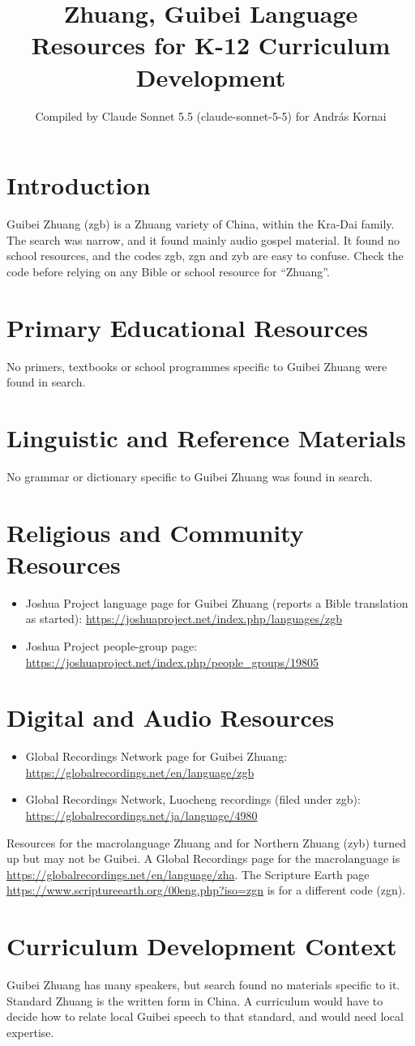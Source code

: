 \documentclass[12pt]{article}
\title{Zhuang, Guibei Language Resources for K-12 Curriculum Development}
\author{Compiled by Claude Sonnet 5.5 (claude-sonnet-5-5) for Andr\'as Kornai}
\date{}
\begin{document}
\maketitle

\section{Introduction}
Guibei Zhuang (zgb) is a Zhuang variety of China, within the Kra-Dai family. The search was narrow, and it found mainly audio gospel material. It found no school resources, and the codes zgb, zgn and zyb are easy to confuse. Check the code before relying on any Bible or school resource for ``Zhuang''.

\section{Primary Educational Resources}
No primers, textbooks or school programmes specific to Guibei Zhuang were found in search.

\section{Linguistic and Reference Materials}
No grammar or dictionary specific to Guibei Zhuang was found in search.

\section{Religious and Community Resources}
\begin{itemize}
\item Joshua Project language page for Guibei Zhuang (reports a Bible translation as started): \url{https://joshuaproject.net/index.php/languages/zgb}
\item Joshua Project people-group page: \url{https://joshuaproject.net/index.php/people_groups/19805}
\end{itemize}

\section{Digital and Audio Resources}
\begin{itemize}
\item Global Recordings Network page for Guibei Zhuang: \url{https://globalrecordings.net/en/language/zgb}
\item Global Recordings Network, Luocheng recordings (filed under zgb): \url{https://globalrecordings.net/ja/language/4980}
\end{itemize}
Resources for the macrolanguage Zhuang and for Northern Zhuang (zyb) turned up but may not be Guibei. A Global Recordings page for the macrolanguage is \url{https://globalrecordings.net/en/language/zha}. The Scripture Earth page \url{https://www.scriptureearth.org/00eng.php?iso=zgn} is for a different code (zgn).

\section{Curriculum Development Context}
Guibei Zhuang has many speakers, but search found no materials specific to it. Standard Zhuang is the written form in China. A curriculum would have to decide how to relate local Guibei speech to that standard, and would need local expertise.
\end{document}
